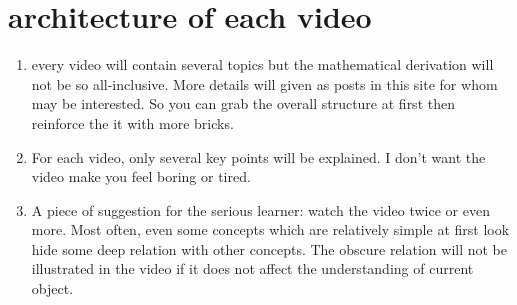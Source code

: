 \documentclass[koma,utopia,letterpaper,captions=tableheading,11pt,listings-sv,microtype,paralist,colorlinks=true,urlcolor=blue]{org-article}
\begin{document}
\section{architecture of each video}
\label{sec:org64de00f}


\begin{enumerate}
\item every video will contain several topics but the mathematical derivation will
not be so all-inclusive. More details will given as posts in this site for whom
may be interested. So you can grab the overall structure at first then
reinforce the it with more bricks.
\item For each video, only several key points will be explained. I don't want the
video make you feel boring or tired.
\item A piece of suggestion for the serious learner: watch the video twice or even
more. Most often, even some concepts which are relatively simple at first
look hide some deep relation with other concepts. The obscure relation will
not be illustrated in the video if it does not affect the understanding of
current object.
\end{enumerate}
\end{document}
